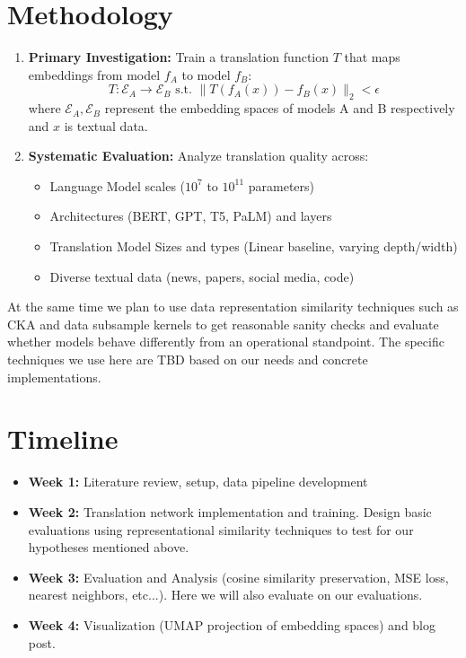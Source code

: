 \documentclass[9pt,letterpaper]{article}
\begin{document}
\section*{Methodology} \label{section:methodology}

\begin{enumerate}
    \item \textbf{Primary Investigation:} Train a translation function $T$ that maps embeddings from model $f_A$ to model $f_B$:
    \begin{equation}
        T: \mathcal{E}_A \rightarrow \mathcal{E}_B \text{ s.t. } \|T(f_A(x)) - f_B(x)\|_2 < \epsilon
    \end{equation}
    where $\mathcal{E}_A, \mathcal{E}_B$ represent the embedding spaces of models A and B respectively and $x$ is textual data.

    \item \textbf{Systematic Evaluation:} Analyze translation quality across:
    \begin{itemize}
        \item Language Model scales ($10^7$ to $10^{11}$ parameters)
        \item Architectures (BERT, GPT, T5, PaLM) and layers
        \item Translation Model Sizes and types (Linear baseline, varying depth/width)
        \item Diverse textual data (news, papers, social media, code)
    \end{itemize}
\end{enumerate}

At the same time we plan to use data representation similarity techniques such as CKA and data subsample kernels to get reasonable sanity checks and evaluate whether models behave differently from an operational standpoint. The specific techniques we use here are TBD based on our needs and concrete implementations.

\section*{Timeline}
\begin{itemize}
    \item \textbf{Week 1:} Literature review, setup, data pipeline development
    \item \textbf{Week 2:} Translation network implementation and training. Design basic evaluations using representational similarity techniques to test for our hypotheses mentioned above.
    \item \textbf{Week 3:} Evaluation and Analysis (cosine similarity preservation, MSE loss, nearest neighbors, etc...). Here we will also evaluate on our evaluations.
    \item \textbf{Week 4:} Visualization (UMAP projection of embedding spaces) and blog post.
\end{itemize}
\end{document}
